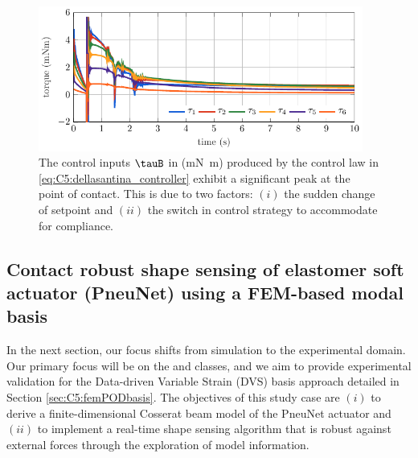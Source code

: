 \begin{figure}[!t]
    \centering
    \includegraphics*[width=0.95\textwidth]{./pdf/thesis-figure-6-32.pdf}
    \caption{The control inputs $\tauB$ in (\si{\milli \newton \meter}) produced by the control law in \eqref{eq:C5:dellasantina_controller} exhibit a significant peak at the point of contact. This is due to two factors: $(i)$ the sudden change of setpoint and $(ii)$ the switch in control strategy to accommodate for compliance.}
    \label{fig:C5:dellasantina_input}
\end{figure}

\subsection[Contact robust shape sensing of elastomer soft actuator]{Contact robust shape sensing of elastomer soft actuator (PneuNet) using a FEM-based modal basis}
In the next section, our focus shifts from simulation to the experimental domain. Our primary focus will be on the  and  classes, and we aim to provide experimental validation for the Data-driven Variable Strain (DVS) basis approach detailed in Section \ref{sec:C5:femPODbasis}. The objectives of this study case are $(i)$ to derive a finite-dimensional Cosserat beam model of the PneuNet actuator and $(ii)$ to implement a real-time shape sensing algorithm that is robust against external forces through the exploration of model information.

